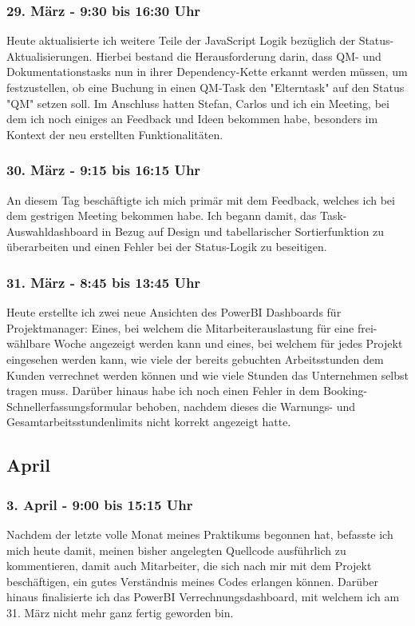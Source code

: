 \subsubsection*{29. März - 9:30 bis 16:30 Uhr}
Heute aktualisierte ich weitere Teile der JavaScript Logik bezüglich der Status-Aktualisierungen. Hierbei bestand die Herausforderung darin, dass QM- und Dokumentationstasks nun in ihrer Dependency-Kette erkannt werden müssen, um festzustellen, ob eine Buchung in einen QM-Task den "Elterntask" auf den Status "QM" setzen soll. Im Anschluss hatten Stefan, Carlos und ich ein Meeting, bei dem ich noch einiges an Feedback und Ideen bekommen habe, besonders im Kontext der neu erstellten Funktionalitäten.

\subsubsection*{30. März - 9:15 bis 16:15 Uhr}
An diesem Tag beschäftigte ich mich primär mit dem Feedback, welches ich bei dem gestrigen Meeting bekommen habe. Ich begann damit, das Task-Auswahldashboard in Bezug auf Design und tabellarischer Sortierfunktion zu überarbeiten und einen Fehler bei der Status-Logik zu beseitigen.  

\subsubsection*{31. März - 8:45 bis 13:45 Uhr}
Heute erstellte ich zwei neue Ansichten des PowerBI Dashboards für Projektmanager: Eines, bei welchem die Mitarbeiterauslastung für eine frei-wählbare Woche angezeigt werden kann und eines, bei welchem für jedes Projekt eingesehen werden kann, wie viele der bereits gebuchten Arbeitsstunden dem Kunden verrechnet werden können und wie viele Stunden das Unternehmen selbst tragen muss. Darüber hinaus habe ich noch einen Fehler in dem Booking-Schnellerfassungsformular behoben, nachdem dieses die Warnungs- und Gesamtarbeitsstundenlimits nicht korrekt angezeigt hatte.  

\subsection{April}
\subsubsection*{3. April - 9:00 bis 15:15 Uhr}
Nachdem der letzte volle Monat meines Praktikums begonnen hat, befasste ich mich heute damit, meinen bisher angelegten Quellcode ausführlich zu kommentieren, damit auch Mitarbeiter, die sich nach mir mit dem Projekt beschäftigen, ein gutes Verständnis meines Codes erlangen können. Darüber hinaus finalisierte ich das PowerBI Verrechnungsdashboard, mit welchem ich am 31. März nicht mehr ganz fertig geworden bin.

